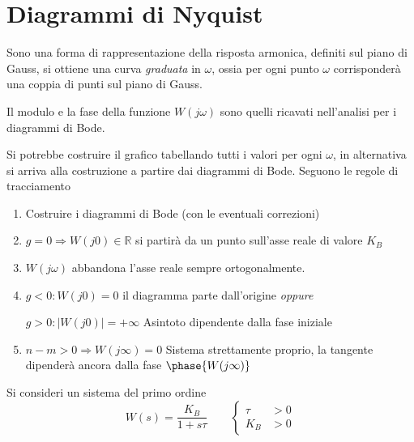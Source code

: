 
\section{Diagrammi di Nyquist}
Sono una forma di rappresentazione della risposta armonica, definiti sul piano
di Gauss, si ottiene una curva \textit{graduata} in $\omega$, ossia per ogni
punto $\omega$ corrisponderà una coppia di punti sul piano di Gauss.

Il modulo e la fase della funzione $W(j\omega)$ sono quelli ricavati
nell'analisi per i diagrammi di Bode.

Si potrebbe costruire il grafico tabellando tutti i valori per ogni $\omega$,
in alternativa si arriva alla costruzione a partire dai diagrammi di Bode.
Seguono le regole di tracciamento
\begin{enumerate}
 \item Costruire i diagrammi di Bode (con le eventuali correzioni)
 \item $g=0 \Rightarrow W(j0) \in \mathbb{R}$ si partirà da un punto sull'asse
reale di valore $K_B$
\item $W(j\omega)$ abbandona l'asse reale sempre ortogonalmente.
\item $g<0:W(j0) = 0$ il diagramma parte dall'origine \textit{oppure}

$g>0: |W(j0)| = +\infty$ Asintoto dipendente dalla fase iniziale

\item $n-m>0 \Rightarrow W(j\infty) = 0$ Sistema strettamente proprio, la
tangente dipenderà ancora dalla fase $\phase{W(j\infty)}$
\end{enumerate}

Si consideri un sistema del primo ordine
$$
W(s)  = \frac{K_B}{1+s\tau} \qquad
\left\{\begin{aligned}
\tau&>0\\
K_B&>0
\end{aligned}\right.
$$
